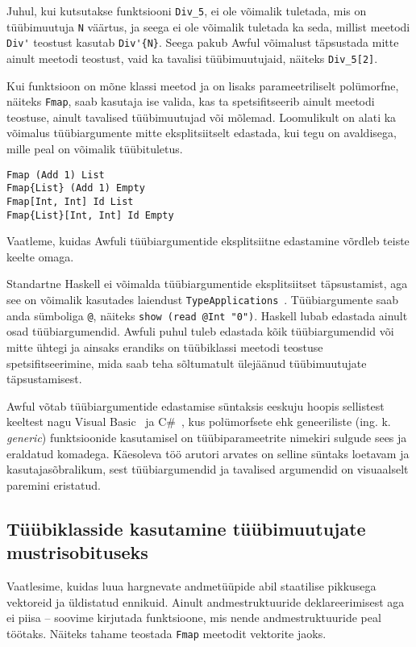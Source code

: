 \documentclass[12pt]{article}
\begin{document}
        Juhul, kui kutsutakse funktsiooni \verb!Div_5!, ei ole võimalik tuletada, mis on tüübimuutuja \verb!N! väärtus, ja seega ei ole võimalik tuletada ka seda, millist meetodi \verb!Div'! teostust kasutab \verb!Div'{N}!. Seega pakub Awful võimalust täpsustada mitte ainult meetodi teostust, vaid ka tavalisi tüübimuutujaid, näiteks \verb!Div_5[2]!.

        Kui funktsioon on mõne klassi meetod ja on lisaks parameetriliselt polümorfne, näiteks \verb!Fmap!, saab kasutaja ise valida, kas ta spetsifitseerib ainult meetodi teostuse, ainult tavalised tüübimuutujad või mõlemad. Loomulikult on alati ka võimalus tüübiargumente mitte eksplitsiitselt edastada, kui tegu on avaldisega, mille peal on võimalik tüübituletus.

        \begin{verbatim}Fmap (Add 1) List
Fmap{List} (Add 1) Empty
Fmap[Int, Int] Id List
Fmap{List}[Int, Int] Id Empty\end{verbatim}

        Vaatleme, kuidas Awfuli tüübiargumentide eksplitsiitne edastamine võrdleb teiste keelte omaga.

        Standartne Haskell ei võimalda tüübiargumentide eksplitsiitset täpsustamist, aga see on võimalik kasutades laiendust \verb!TypeApplications!~\cite{Gla}. Tüübiargumente saab anda sümboliga \verb!@!, näiteks \verb!show (read @Int "0")!. Haskell lubab edastada ainult osad tüübiargumendid. Awfuli puhul tuleb edastada kõik tüübiargumendid või mitte ühtegi ja ainsaks erandiks on tüübiklassi meetodi teostuse spetsifitseerimine, mida saab teha sõltumatult ülejäänud tüübimuutujate täpsustamisest.

        Awful võtab tüübiargumentide edastamise süntaksis eeskuju hoopis sellistest keeltest nagu Visual Basic~\cite{Vis} ja C\#~\cite{C}, kus polümorfsete ehk geneeriliste (ing. k. \textit{generic}) funktsioonide kasutamisel on tüübiparameetrite nimekiri sulgude sees ja eraldatud komadega. Käesoleva töö arutori arvates on selline süntaks loetavam ja kasutajasõbralikum, sest tüübiargumendid ja tavalised argumendid on visuaalselt paremini eristatud.
    \subsection{Tüübiklasside kasutamine tüübimuutujate mustrisobituseks}\label{tyybiklassihakk}
      Vaatlesime, kuidas luua hargnevate andmetüüpide abil staatilise pikkusega vektoreid ja üldistatud ennikuid. Ainult andmestruktuuride deklareerimisest aga ei piisa -- soovime kirjutada funktsioone, mis nende andmestruktuuride peal töötaks. Näiteks tahame teostada \verb!Fmap! meetodit vektorite jaoks.
\end{document}
